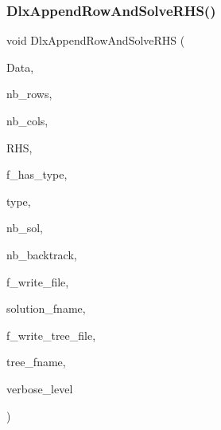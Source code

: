 \mbox{\label{_l_i_b_2_g_a_l_o_i_s_2dlx_8_c_a799f4f346746fa1a5cc1367db9495f20}} 
\subsubsection{\texorpdfstring{Dlx\+Append\+Row\+And\+Solve\+R\+H\+S()}{DlxAppendRowAndSolveRHS()}}
{\footnotesize\ttfamily void Dlx\+Append\+Row\+And\+Solve\+R\+HS (\begin{DoxyParamCaption}\item[{\mbox{\hyperlink{galois_8h_a09fddde158a3a20bd2dcadb609de11dc}{I\+NT}} $\ast$}]{Data,  }\item[{\mbox{\hyperlink{galois_8h_a09fddde158a3a20bd2dcadb609de11dc}{I\+NT}}}]{nb\+\_\+rows,  }\item[{\mbox{\hyperlink{galois_8h_a09fddde158a3a20bd2dcadb609de11dc}{I\+NT}}}]{nb\+\_\+cols,  }\item[{\mbox{\hyperlink{galois_8h_a09fddde158a3a20bd2dcadb609de11dc}{I\+NT}} $\ast$}]{R\+HS,  }\item[{\mbox{\hyperlink{galois_8h_a09fddde158a3a20bd2dcadb609de11dc}{I\+NT}}}]{f\+\_\+has\+\_\+type,  }\item[{\mbox{\hyperlink{galois_8h_a331aa0f3283349b42f6bab83e017cdc1}{diophant\+\_\+equation\+\_\+type}} $\ast$}]{type,  }\item[{\mbox{\hyperlink{galois_8h_a09fddde158a3a20bd2dcadb609de11dc}{I\+NT}} \&}]{nb\+\_\+sol,  }\item[{\mbox{\hyperlink{galois_8h_a09fddde158a3a20bd2dcadb609de11dc}{I\+NT}} \&}]{nb\+\_\+backtrack,  }\item[{\mbox{\hyperlink{galois_8h_a09fddde158a3a20bd2dcadb609de11dc}{I\+NT}}}]{f\+\_\+write\+\_\+file,  }\item[{const \mbox{\hyperlink{galois_8h_ab6cc7b4aeb6ea31aba2b3fbfc83ff5e6}{B\+Y\+TE}} $\ast$}]{solution\+\_\+fname,  }\item[{\mbox{\hyperlink{galois_8h_a09fddde158a3a20bd2dcadb609de11dc}{I\+NT}}}]{f\+\_\+write\+\_\+tree\+\_\+file,  }\item[{const \mbox{\hyperlink{galois_8h_ab6cc7b4aeb6ea31aba2b3fbfc83ff5e6}{B\+Y\+TE}} $\ast$}]{tree\+\_\+fname,  }\item[{\mbox{\hyperlink{galois_8h_a09fddde158a3a20bd2dcadb609de11dc}{I\+NT}}}]{verbose\+\_\+level }\end{DoxyParamCaption})}

